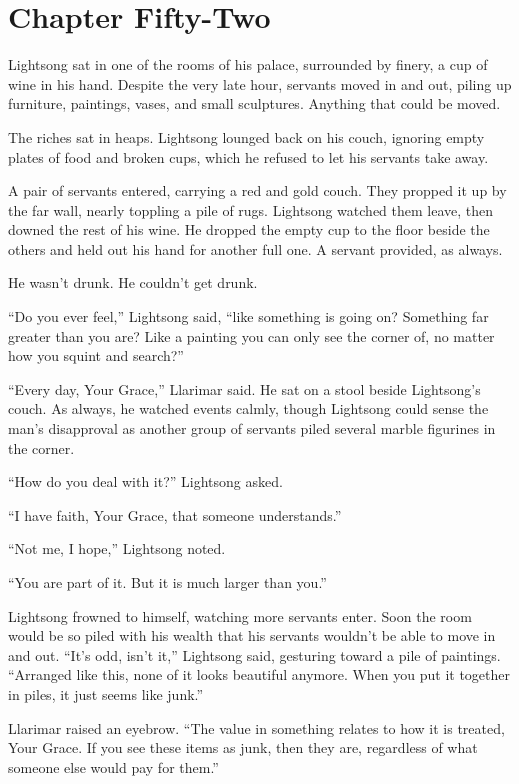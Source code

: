 \section{Chapter Fifty-Two}

Lightsong sat in one of the rooms of his palace, surrounded by finery, a cup of wine in his hand. Despite the very late hour, servants moved in and out, piling up furniture, paintings, vases, and small sculptures. Anything that could be moved.

The riches sat in heaps. Lightsong lounged back on his couch, ignoring empty plates of food and broken cups, which he refused to let his servants take away.

A pair of servants entered, carrying a red and gold couch. They propped it up by the far wall, nearly toppling a pile of rugs. Lightsong watched them leave, then downed the rest of his wine. He dropped the empty cup to the floor beside the others and held out his hand for another full one. A servant provided, as always.

He wasn’t drunk. He couldn’t get drunk.

“Do you ever feel,” Lightsong said, “like something is going on? Something far greater than you are? Like a painting you can only see the corner of, no matter how you squint and search?”

“Every day, Your Grace,” Llarimar said. He sat on a stool beside Lightsong’s couch. As always, he watched events calmly, though Lightsong could sense the man’s disapproval as another group of servants piled several marble figurines in the corner.

“How do you deal with it?” Lightsong asked.

“I have faith, Your Grace, that someone understands.”

“Not me, I hope,” Lightsong noted.

“You are part of it. But it is much larger than you.”

Lightsong frowned to himself, watching more servants enter. Soon the room would be so piled with his wealth that his servants wouldn’t be able to move in and out. “It’s odd, isn’t it,” Lightsong said, gesturing toward a pile of paintings. “Arranged like this, none of it looks beautiful anymore. When you put it together in piles, it just seems like junk.”

Llarimar raised an eyebrow. “The value in something relates to how it is treated, Your Grace. If you see these items as junk, then they are, regardless of what someone else would pay for them.”

